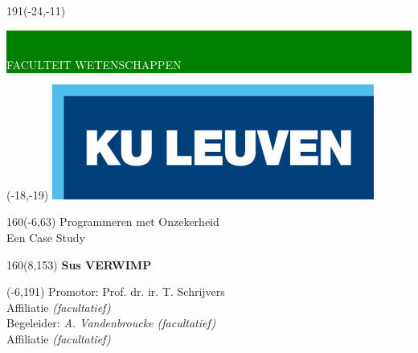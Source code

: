 \documentclass[12pt,a4paper,oneside]{book}
\theoremstyle{definition}
\begin{document}
\thispagestyle{empty}
\newcommand{\form}[1]{\scalebox{1.087}{\boldmath{#1}}}
\sffamily
%
\begin{textblock}{191}(-24,-11)
\colorbox{green}{\hspace{123mm}\ \parbox[c][18truemm]{68mm}{\textcolor{white}{FACULTEIT WETENSCHAPPEN}}}
\end{textblock}
%
\begin{textblock}{70}(-18,-19)
\textblockcolour{}
\includegraphics*[height=19.8truemm]{LogoKULeuven}
\end{textblock}
%
\begin{textblock}{160}(-6,63)
\textblockcolour{}
\vspace{-\parskip}
\flushleft
\fontsize{40}{42}\selectfont \textcolor{bluetitle}{Programmeren met Onzekerheid}\\[1.5mm]
\fontsize{20}{22}\selectfont Een Case Study
\end{textblock}
%
\begin{textblock}{160}(8,153)
\textblockcolour{}
\vspace{-\parskip}
\flushright
\fontsize{14}{16}\selectfont \textbf{Sus VERWIMP}
\end{textblock}
%
\begin{textblock}{70}(-6,191)
\textblockcolour{}
\vspace{-\parskip}
\flushleft
Promotor: Prof. dr. ir. T. Schrijvers\\[-2pt]
\textcolor{blueaff}{Affiliatie \textsl{(facultatief)}}\\[5pt]
Begeleider: \textsl{A. Vandenbroucke (facultatief)}\\[-2pt]
\textcolor{blueaff}{Affiliatie \textsl{(facultatief)}}\\
\end{textblock}
\end{document}
